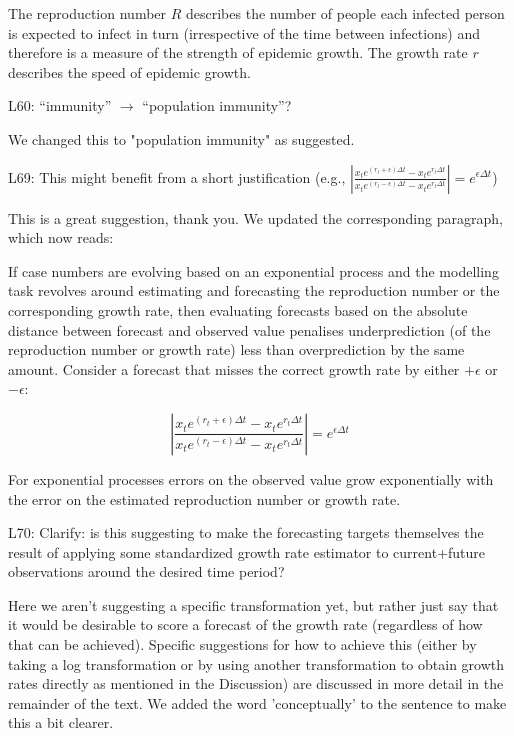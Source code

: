 \documentclass{article}
\newcommand{\black}{\color{black}}
\newcommand{\blue}{\color{blue}}
\newcommand{\indented}{\setlength{\leftskip}{1cm}}
\newcommand{\notindented}{\setlength{\leftskip}{0cm}}
\begin{document}
\indented
The reproduction number $R$ describes the number of people each infected person is expected to infect in turn (irrespective of the time between infections) and therefore is a measure of the strength of epidemic growth. The growth rate $r$ describes the speed of epidemic growth.

\notindented

\blue
L60: “immunity” $\xrightarrow{}$ “population immunity”?

\black
We changed this to "population immunity" as suggested. 

\blue
L69: This might benefit from a short justification (e.g.,
$\left| \frac{x_t e^{(r_t + \epsilon) \Delta t} - x_t e^{r_t \Delta t}}{x_t e^{(r_t - \epsilon) \Delta t} - x_t e^{r_t \Delta t}} \right| = e^{\epsilon\Delta t}$)

\black
This is a great suggestion, thank you. We updated the corresponding paragraph, which now reads: 

\indented
If case numbers are evolving based on an exponential process and the  modelling task revolves around estimating and forecasting the reproduction number or the corresponding growth rate, then evaluating forecasts based on the absolute distance between forecast and observed value penalises underprediction (of the reproduction number or growth rate) less than overprediction by the same amount. Consider a forecast that misses the correct growth rate by either $+\epsilon$ or $-\epsilon$:

\begin{equation}
\left| \frac{x_t e^{(r_t + \epsilon) \Delta t} - x_t e^{r_t \Delta t}}{x_t e^{(r_t - \epsilon) \Delta t} - x_t e^{r_t \Delta t}} \right| = e^{\epsilon\Delta t}
\end{equation}

For exponential processes errors on the observed value grow exponentially with the error on the estimated reproduction number or growth rate.

\notindented
\blue
L70: Clarify: is this suggesting to make the forecasting targets themselves the result of applying some standardized growth rate estimator to current+future observations around the desired time period?

\black 
Here we aren't suggesting a specific transformation yet, but rather just say that it would be desirable to score a forecast of the growth rate (regardless of how that can be achieved). Specific suggestions for how to achieve this (either by taking a log transformation or by using another transformation to obtain growth rates directly as mentioned in the Discussion) are discussed in more detail in the remainder of the text. We added the word 'conceptually' to the sentence to make this a bit clearer. 
\end{document}
